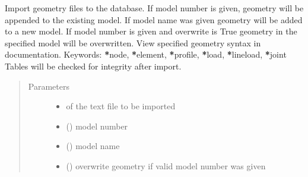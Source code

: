 \documentclass[letterpaper,10pt,english]{sphinxmanual}
\begin{document}
\begin{fulllineitems}
\begin{fulllineitems}
\label{\detokenize{api:beamon.database.database.Database.import_text}}
Import geometry files to the database. If model number is given, geometry will be appended to the existing
model. If model name was given geometry will be added to a new model.
If model number is given and overwrite is True geometry in the specified model will be overwritten.
View specified geometry syntax in documentation.
Keywords: {\color{red}\bfseries{}*}node, {\color{red}\bfseries{}*}element, {\color{red}\bfseries{}*}profile, {\color{red}\bfseries{}*}load, {\color{red}\bfseries{}*}lineload, {\color{red}\bfseries{}*}joint
Tables will be checked for integrity after import.
\begin{quote}\begin{description}
\item[{Parameters}] \leavevmode\begin{itemize}
\item {} 
 \textendash{} of the text file to be imported

\item {} 
 () \textendash{} model number

\item {} 
 () \textendash{} model name

\item {} 
 () \textendash{} overwrite geometry if valid model number was given


\end{itemize}
\end{description}
\end{quote}
\end{fulllineitems}
\end{fulllineitems}
\end{document}
